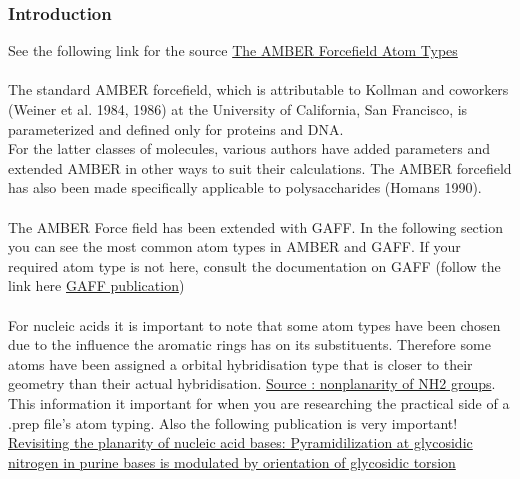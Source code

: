 \documentclass[a4paper]{article}
\begin{document}
\subsubsection{Introduction}
See the following link for the source \href{http://www.uoxray.uoregon.edu/local/manuals/biosym/discovery/General/Forcefields/AMBER.html#C_all}{The AMBER Forcefield Atom Types}\\
\\
The standard AMBER forcefield, which is attributable to Kollman and coworkers (Weiner et al. 1984, 1986) at the University of California, San Francisco, is parameterized and defined only for proteins and DNA.\\
For the latter classes of molecules, various authors have added parameters and extended AMBER in other ways to suit their calculations.
The AMBER forcefield has also been made specifically applicable to polysaccharides (Homans 1990). \\
\\
The AMBER Force field has been extended with GAFF. In the following section you can see the most common atom types in AMBER and GAFF. If your required atom type is not here, consult the documentation on GAFF (follow the link here \href{https://pubmed.ncbi.nlm.nih.gov/15116359/}{GAFF publication})\\
\\
For nucleic acids it is important to note that some atom types have been chosen due to the influence the aromatic rings has on its substituents. Therefore some atoms have been assigned a orbital hybridisation type that is closer to their geometry than their actual hybridisation. \href{https://structbio.vanderbilt.edu/archives/amber-archive/2006/4057.php}{Source : nonplanarity of NH2 groups}. This information it important for when you are researching the practical side of a .prep file's atom typing. Also the following publication is very important! \href{https://pubmed.ncbi.nlm.nih.gov/19786496/}{Revisiting the planarity of nucleic acid bases: Pyramidilization at glycosidic nitrogen in purine bases is modulated by orientation of glycosidic torsion}
%
%
\end{document}
